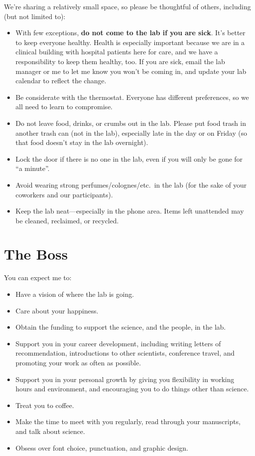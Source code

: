 \documentclass[letterpaper,12pt,oneside]{memoir}
\begin{document}
We're sharing a relatively small space, so please be thoughtful of others, including (but not limited to):

\begin{itemize}
\item With few exceptions, \textbf{do not come to the lab if you are sick}. It's better to keep everyone healthy. Health is especially important because we are in a clinical building with hospital patients here for care, and we have a responsibility to keep them healthy, too. If you are sick, email the lab manager or me to let me know you won't be coming in, and update your lab calendar to reflect the change.
\item Be considerate with the thermostat. Everyone has different preferences, so we all need to learn to compromise.
\item Do not leave food, drinks, or crumbs out in the lab. Please put food trash in another trash can (not in the lab), especially late in the day or on Friday (so that food doesn't stay in the lab overnight).
\item Lock the door if there is no one in the lab, even if you will only be gone for ``a minute''.
\item Avoid wearing strong perfumes/colognes/etc.\ in the lab (for the sake of your coworkers and our participants).
\item Keep the lab neat---especially in the phone area. Items left unattended may be cleaned, reclaimed, or recycled.
\end{itemize}


\section{The Boss}

You can expect me to:

\begin{itemize}
\item Have a vision of where the lab is going.
\item Care about your happiness.
\item Obtain the funding to support the science, and the people, in the lab.
\item Support you in your career development, including writing letters of recommendation, introductions to other scientists, conference travel, and promoting your work as often as possible.
\item Support you in your personal growth by giving you flexibility in working hours and environment, and encouraging you to do things other than science.
\item Treat you to coffee.
\item Make the time to meet with you regularly, read through your manuscripts, and talk about science.
\item Obsess over font choice, punctuation, and graphic design.
\end{itemize}
\end{document}
